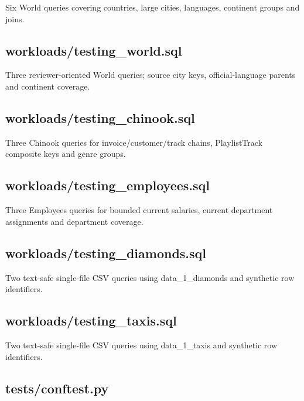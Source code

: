 Six World queries covering countries, large cities, languages, continent groups and joins.


\subsection*{workloads/testing\_world.sql}

Three reviewer-oriented World queries; source city keys, official-language parents and continent coverage.


\subsection*{workloads/testing\_chinook.sql}

Three Chinook queries for invoice/customer/track chains, PlaylistTrack composite keys and genre groups.


\subsection*{workloads/testing\_employees.sql}

Three Employees queries for bounded current salaries, current department assignments and department coverage.


\subsection*{workloads/testing\_diamonds.sql}

Two text-safe single-file CSV queries using data\_1\_diamonds and synthetic row identifiers.


\subsection*{workloads/testing\_taxis.sql}

Two text-safe single-file CSV queries using data\_1\_taxis and synthetic row identifiers.


\subsection*{tests/conftest.py}

